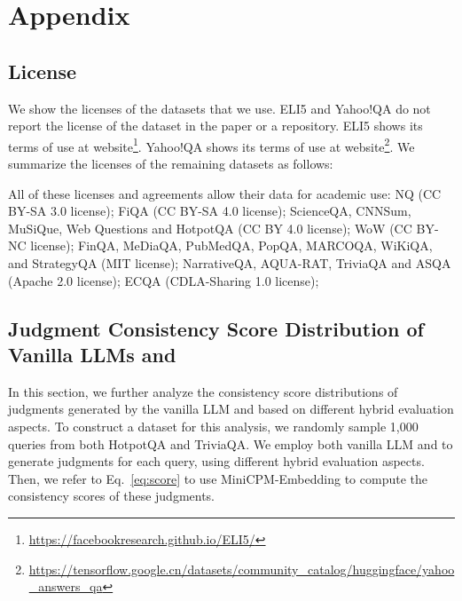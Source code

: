 \section{Appendix}
\label{sec:appendix}




\subsection{License}
We show the licenses of the datasets that we use. ELI5 and Yahoo!QA do not report the license of the dataset in the paper or a repository. ELI5 shows its terms of use at website\footnote{\url{https://facebookresearch.github.io/ELI5/}}. Yahoo!QA shows its terms of use at website\footnote{\url{https://tensorflow.google.cn/datasets/community_catalog/huggingface/yahoo_answers_qa}}. We summarize the licenses of the remaining datasets as follows:

All of these licenses and agreements allow their data for academic use: NQ (CC BY-SA 3.0 license); FiQA (CC BY-SA 4.0 license); ScienceQA, CNNSum, MuSiQue, Web Questions and HotpotQA (CC BY 4.0 license); WoW (CC BY-NC license); FinQA, MeDiaQA, PubMedQA, PopQA, MARCOQA, WiKiQA, and StrategyQA (MIT license); NarrativeQA, AQUA-RAT, TriviaQA and ASQA (Apache 2.0 license); ECQA (CDLA-Sharing 1.0 license); 



% 

\subsection{Judgment Consistency Score Distribution of Vanilla LLMs and \method{}}
\label{sec:consistency score distribution}
In this section, we further analyze the consistency score distributions of judgments generated by the vanilla LLM and \method{} based on different hybrid evaluation aspects. To construct a dataset for this analysis, we randomly sample 1,000 queries from both HotpotQA and TriviaQA. We employ both vanilla LLM and \method{} to generate judgments for each query, using different hybrid evaluation aspects. Then, we refer to Eq.~\ref{eq:score} to use MiniCPM-Embedding to compute the consistency scores of these judgments.

